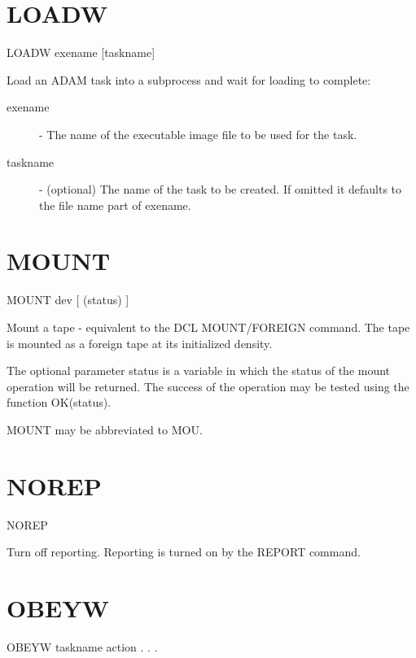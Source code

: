 \section{LOADW}


    LOADW \hspace{.5cm} exename \hspace{.5cm} [taskname]

    Load an ADAM task into a subprocess and wait for loading to complete:
\begin{description}

\item[exename] - The name of the executable image file to
            be used for the task.

\item[taskname] - (optional) The name of the task to be created.
            If omitted it defaults to the file name part of
            exename.

\end{description}

\section{MOUNT}

    MOUNT \hspace{.5cm} dev \hspace{.5cm} [ (status) ]

 Mount a tape - equivalent to the DCL MOUNT/FOREIGN command. The tape
 is mounted as a foreign tape at its initialized density.

 The optional parameter status is a variable in which the status of
 the mount operation will be returned. The success of the operation
 may be tested using the function OK(status).

 MOUNT may be abbreviated to MOU.

\section{NOREP}

   NOREP

Turn off reporting. Reporting is turned on by the REPORT command.
                 


\section{OBEYW}

    OBEYW \hspace{.5cm} taskname \hspace{.5cm} action  . . . 

